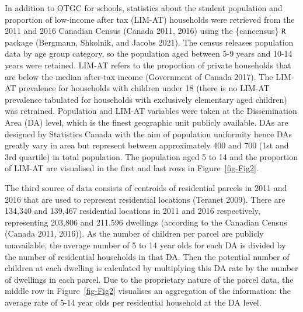 \documentclass[
default
]{sn-jnl}
\begin{document}
In addition to OTGC for schools, statistics about the student population
and proportion of low-income after tax (LIM-AT) households were
retrieved from the 2011 and 2016 Canadian Census (Canada 2011, 2016)
using the \{cancensus\} \texttt{R} package (Bergmann, Shkolnik, and
Jacobs 2021). The census releases population data by age group category,
so the population aged between 5-9 years and 10-14 years were retained.
LIM-AT refers to the proportion of private households that are below the
median after-tax income (Government of Canada 2017). The LIM-AT
prevalence for households with children under 18 (there is no LIM-AT
prevalence tabulated for households with exclusively elementary aged
children) was retrained. Population and LIM-AT variables were taken at
the Dissemination Area (DA) level, which is the finest geographic unit
publicly available. DAs are designed by Statistics Canada with the aim
of population uniformity hence DAs greatly vary in area but represent
between approximately 400 and 700 (1st and 3rd quartile) in total
population. The population aged 5 to 14 and the proportion of LIM-AT are
visualised in the first and last rows in Figure~\ref{fig-Fig2}.

The third source of data consists of centroids of residential parcels in
2011 and 2016 that are used to represent residential locations (Teranet
2009). There are 134,340 and 139,467 residential locations in 2011 and
2016 respectively, representing 203,806 and 211,596 dwellings (according
to the Canadian Census (Canada 2011, 2016)). As the number of children
per parcel are publicly unavailable, the average number of 5 to 14 year
olds for each DA is divided by the number of residential households in
that DA. Then the potential number of children at each dwelling is
calculated by multiplying this DA rate by the number of dwellings in
each parcel. Due to the proprietary nature of the parcel data, the
middle row in Figure~\ref{fig-Fig2} visualises an aggregation of the
information: the average rate of 5-14 year olds per residential
household at the DA level.
\end{document}
